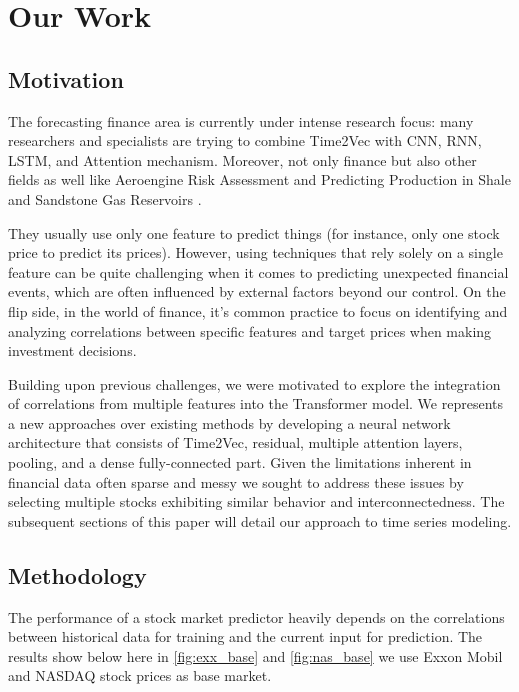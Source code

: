 \chapter{Our Work}
\label{ch:ourwork}

\section{Motivation}
The forecasting finance area is currently under intense research focus: many researchers
and specialists are trying to combine Time2Vec with CNN, RNN, LSTM, and
Attention mechanism. Moreover, not only finance but also other fields as well
like Aeroengine Risk Assessment \cite{10278395} and Predicting Production in
Shale and Sandstone Gas Reservoirs \cite{FARGALLA2024130184}.

They usually use only one feature to predict things (for instance, only one
stock price to predict its prices). However, using techniques that rely solely on
a single feature can be quite challenging when it comes to predicting unexpected
financial events, which are often influenced by external factors beyond our
control. On the flip side, in the world of finance, it's common practice to focus
on identifying and analyzing correlations between specific features and target prices
when making investment decisions.

Building upon previous challenges, we were motivated to explore the integration
of correlations from multiple features into the Transformer model. We represents
a new approaches over existing methods by developing a neural network architecture
that consists of Time2Vec, residual, multiple attention layers, pooling, and a dense
fully-connected part. Given the limitations inherent in financial data often
sparse and messy we sought to address these issues by selecting multiple stocks
exhibiting similar behavior and interconnectedness. The subsequent sections of this
paper will detail our approach to time series modeling.

\section{Methodology}
The performance of a stock market predictor heavily depends on the correlations between
historical data for training and the current input for prediction. The results
show below here in \autoref{fig:exx_base} and \autoref{fig:nas_base} we use
Exxon Mobil and NASDAQ stock prices as base market.

